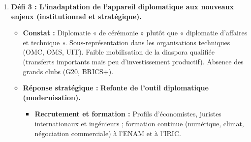 \documentclass[11pt]{article}
\begin{document}
\begin{exoresolu}
\begin{enumerate}
            \begin{itemize}
                \item \textbf{Constat :} Trois fronts actifs (Extrême-Nord / Boko Haram, Nord-Ouest et Sud-Ouest / crise anglophone, Est / frontière centrafricaine). Coût humain et financier massif. Image internationale dégradée (rapports d'ONG sur les droits de l'homme, indices de corruption). Conditionnalités de l'aide (UE, USA, FMI).
                \item \textbf{Réponse stratégique :} \textbf{Diplomatie de la responsabilité et de la prévention.}
                    \begin{itemize}
                        \item \textbf{Justice transitionnelle crédible} (vérité, réconciliation, réparation des victimes) pour lever les conditionnalités.
                        \item \textbf{Diplomatie préventive régionale :} Leadership effectif dans le COPAX, la FMM et la Commission du Bassin du Lac Tchad (CBLT) : mutualisation du renseignement, sécurisation des corridors humanitaires, développement transfrontalier.
                        \item \textbf{Communication stratégique :} Narratif national unifié (ambassadeurs, diaspora, think-tanks comme l'IRIC) pour défendre l'image du pays.
                    \end{itemize}
            \end{itemize}
        \item \textbf{Défi 3 : L'inadaptation de l'appareil diplomatique aux nouveaux enjeux (institutionnel et stratégique).}
            \begin{itemize}
                \item \textbf{Constat :} Diplomatie « de cérémonie » plutôt que « diplomatie d'affaires et technique ». Sous-représentation dans les organisations techniques (OMC, OMS, UIT). Faible mobilisation de la diaspora qualifiée (transferts importants mais peu d'investissement productif). Absence des grands clubs (G20, BRICS+).
                \item \textbf{Réponse stratégique :} \textbf{Refonte de l'outil diplomatique (modernisation).}
                    \begin{itemize}
                        \item \textbf{Recrutement et formation :} Profils d'économistes, juristes internationaux et ingénieurs ; formation continue (numérique, climat, négociation commerciale) à l'ENAM et à l'IRIC.

\end{itemize}
\end{itemize}
\end{enumerate}
\end{exoresolu}
\end{document}
